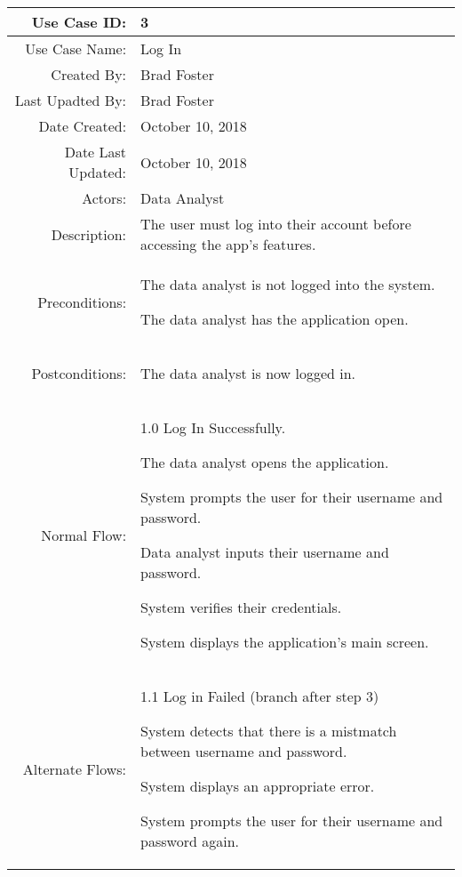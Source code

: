 \documentclass[12pt,oneside,letterpaper]{article}
\newenvironment{packed_enumerate}{ %
\vspace{-7mm}
\begin{enumerate}
  \setlength{\itemsep}{0pt}
  \setlength{\parskip}{0pt}
  \setlength{\parsep}{0pt}
}{\end{enumerate}
\vspace{-8mm}}
\begin{document}
\begin{longtable}{|r|p{3.8in}|}
\hline
Use Case ID:&3\\
\hline
Use Case Name:&Log In\\
\hline
Created By:&Brad Foster\\
\hline
Last Upadted By:&Brad Foster\\
\hline
Date Created:&October 10, 2018\\
\hline
Date Last Updated:&October 10, 2018\\
\hline
Actors:&Data Analyst\\
\hline
Description:&The user must log into their account before accessing the app's features.\\
\hline
Preconditions:&\begin{packed_enumerate}
\item The data analyst is not logged into the system.
\item The data analyst has the application open.
\end{packed_enumerate}\\
\hline
Postconditions:&\begin{packed_enumerate}
\item The data analyst is now logged in.
\end{packed_enumerate}\\
\hline
Normal Flow:&1.0 Log In Successfully.\newline
\begin{packed_enumerate}
\item The data analyst opens the application.
\item System prompts the user for their username and password.
\item Data analyst inputs their username and password.
\item System verifies their credentials.
\item System displays the application's main screen.
\end{packed_enumerate}\\
\hline
Alternate Flows:&1.1 Log in Failed (branch after step 3)\newline
\begin{packed_enumerate}
\item System detects that there is a mistmatch between username and password.
\item System displays an appropriate error.
\item System prompts the user for their username and password again.
\end{packed_enumerate}\\

\end{longtable}
\end{document}
